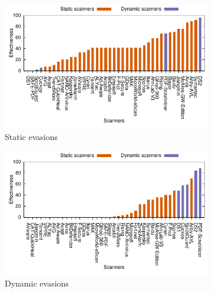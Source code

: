 \begin{figure}[tb]
	\begin{minipage}{0.55\textwidth}
		 \begin{subfigure}{\textwidth}
			  	\hspace{-.6em}\includegraphics{figures/static-evasions-projection}
			  	\caption{Static evasions}
			  	\label{fig: static evasions proj}
		 \end{subfigure}		 
		 \begin{subfigure}{\textwidth}
			  	\hspace{-.6em}\includegraphics{figures/dynamic-evasions-projection}
			  	\caption{Dynamic evasions}
			  	\label{fig: dynamic evasions proj}
		 \end{subfigure}
		 \caption{Per-scanner effectiveness of static and dynamic evasions.}		
	\end{minipage}
	\hspace{1em}
	\begin{minipage}{0.4\linewidth}
		\begin{subfigure}[b]{\textwidth}

\end{subfigure}
\end{minipage}
\end{figure}
